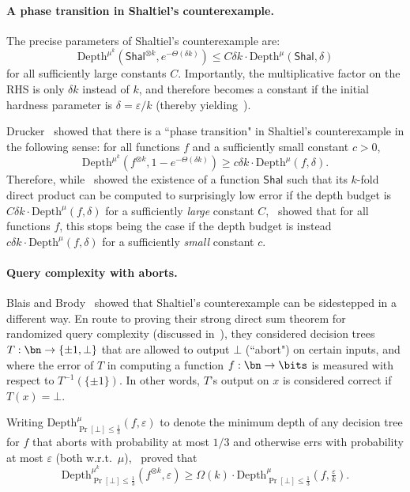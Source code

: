 \paragraph{A phase transition in Shaltiel's counterexample.} 
The precise parameters of Shaltiel's counterexample are:
\[ 
\mathrm{Depth}^{\mu^k}(\mathsf{Shal}^{\otimes k},e^{-\Theta(\delta k)}) \le C\delta k \cdot \mathrm{Depth}^{\mu}(\mathsf{Shal},\delta)
\] 
for all sufficiently large constants $C$. Importantly, the multiplicative factor on the RHS is only $\delta k$ instead of $k$, and therefore becomes a constant if the initial hardness parameter is $\delta = \varepsilon/k$ (thereby yielding~).    


Drucker~\cite{Dru12} showed that there is a ``phase transition" in Shaltiel’s counterexample in the following sense: for all functions $f$ and a sufficiently small constant $c > 0$, 
\begin{equation}
\mathrm{Depth}^{\mu^k}(f^{\otimes k},1-e^{-\Theta(\delta k)}) \ge c\delta k \cdot \mathrm{Depth}^{\mu}(f,\delta).
\label{eq:drucker}
\end{equation}
Therefore, while~\cite{Sha04} showed the existence of a function $\mathsf{Shal}$ such that its $k$-fold direct product can be computed to surprisingly low error if the depth budget is $C\delta k\cdot \mathrm{Depth}^{\mu}(f,\delta)$ for a sufficiently {\sl large} constant $C$,~\cite{Dru12} showed that for all functions $f$, this stops being the case if the depth budget is instead $c\delta k\cdot \mathrm{Depth}^{\mu}(f,\delta)$ for a sufficiently {\sl small} constant $c$.


\paragraph{Query complexity with aborts.} Blais and Brody~\cite{BB19} showed that Shaltiel's counterexample can be sidestepped in a different way. En route to proving their strong direct sum theorem for randomized query complexity (discussed in~), they considered decision trees $T: \bn \to \{\pm 1,\bot\}$ that are allowed to output $\bot$ (``abort") on certain inputs, and where the error of $T$ in computing a function $f: \bn \to \bits$ is measured with respect to $T^{-1}(\{\pm 1\})$. In other words, $T$’s output on $x$ is considered correct if $T(x) = \bot$. 

Writing $\mathrm{Depth}^{\mu}_{\Pr[\bot]\le\frac1{3}}(f,\varepsilon)$ to denote the minimum depth of any decision tree for $f$ that aborts with probability at most $1/3$ and otherwise errs with probability at most $\varepsilon$ (both w.r.t.~$\mu$),~\cite{BB19} proved that 
\begin{equation}
\mathrm{Depth}^{\mu^k}_{\Pr[\bot]\le\frac1{3}}(f^{\otimes k},\varepsilon) \ge \Omega(k) \cdot \mathrm{Depth}^{\mu}_{\Pr[\bot]\le\frac1{3}}(f,\tfrac{\varepsilon}{k}).
\label{eq:blais brody}
\end{equation}


